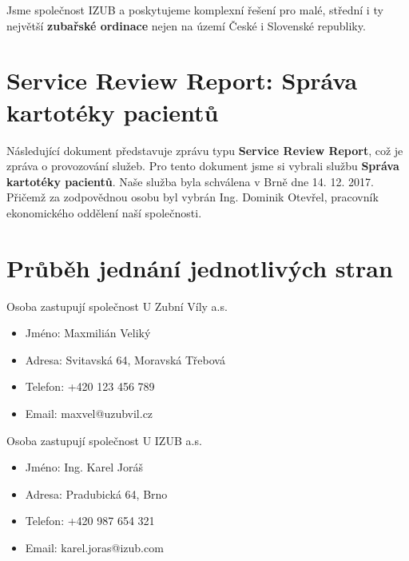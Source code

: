 \documentclass[11pt, a4paper, titlepage]{article}
\begin{document}
	
	\pagestyle{fancy}

	\noindent Jsme společnost IZUB a poskytujeme komplexní řešení pro malé, střední i ty největší \textbf{zubařské ordinace} nejen na území České i Slovenské republiky.

	\vspace{0.5em}

	\section*{Service Review Report: Správa kartotéky pacientů}

	\noindent\makebox[\linewidth]{\rule{17.5cm}{0.4pt}}

	\vspace{0.5em}

	\noindent Následující dokument představuje zprávu typu \textbf{Service Review Report}, což je zpráva o provozování služeb. Pro tento dokument jsme si vybrali službu \textbf{Správa kartotéky pacientů}. Naše služba byla schválena v Brně dne 14. 12. 2017. Přičemž za zodpovědnou osobu byl vybrán Ing. Dominik Otevřel, pracovník ekonomického oddělení naší společnosti.

	\noindent\makebox[\linewidth]{\rule{17.5cm}{0.4pt}}

	\section{Průběh jednání jednotlivých stran}

	\begin{multicols}{2}

	Osoba zastupují společnost U Zubní Víly a.s.
	\begin{itemize}
		\item Jméno: Maxmilián Veliký
		\item Adresa: Svitavská 64, Moravská Třebová
		\item Telefon: +420 123 456 789
		\item Email: maxvel@uzubvil.cz
	\end{itemize}

	Osoba zastupují společnost U IZUB a.s.
	\begin{itemize}
		\item Jméno: Ing. Karel Joráš
		\item Adresa: Pradubická 64, Brno
		\item Telefon: +420 987 654 321
		\item Email: karel.joras@izub.com
	\end{itemize}

	\end{multicols}
\end{document}
